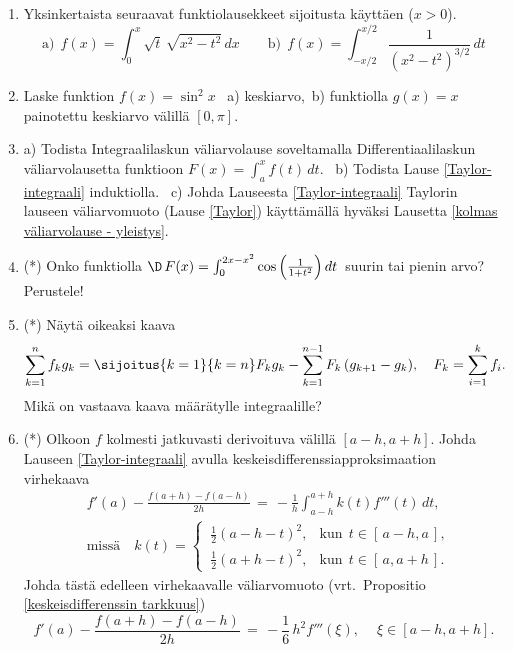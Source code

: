 \begin{enumerate}
\item
Yksinkertaista seuraavat funktiolausekkeet sijoitusta käyttäen ($x>0$).
\[
\text{a)}\ \ f(x)=\int_0^x \sqrt{t}\,\sqrt{x^2-t^2}\,dx \qquad
\text{b)}\ \ f(x)=\int_{-x/2}^{x/2} \frac{1}{(x^2-t^2)^{3/2}}\,dt
\]

\item
Laske funktion $f(x)=\sin^2x$ \ a) keskiarvo, \,b) funktiolla $g(x)=x$ painotettu keskiarvo
välillä $[0,\pi]$.


\item \label{H-int-6: todistuksia}
a) Todista Integraalilaskun väliarvolause soveltamalla Differentiaalilaskun väliarvolausetta
funktioon $F(x)=\int_a^x f(t)\,dt$. \ b) Todista Lause \ref{Taylor-integraali} induktiolla. \
c) Johda Lauseesta \ref{Taylor-integraali} Taylorin lauseen väliarvomuoto (Lause \ref{Taylor})
käyttämällä hyväksi Lausetta \ref{kolmas väliarvolause - yleistys}.

\item (*)
Onko funktiolla $\D\,F(x)=\int_0^{2x-x^2}\cos\left(\frac{1}{1+t^2}\right)dt\,$
suurin tai pienin arvo? Perustele!

\item (*) 
Näytä oikeaksi  kaava
\[
\sum_{k=1}^n f_k g_k = \sijoitus{k=1}{k=n} F_k g_k - \sum_{k=1}^{n-1} F_k\,(g_{k+1}-g_k), \quad
                       F_k = \sum_{i=1}^k f_i.
\]             
Mikä on vastaava kaava määrätylle integraalille?

\item (*) \label{H-int-6: virhekaava}
Olkoon $f$ kolmesti jatkuvasti derivoituva välillä $[a-h,a+h]$. Johda Lauseen
\ref{Taylor-integraali} avulla keskeisdifferenssiapproksimaation virhekaava
\begin{align*}
&f'(a)-\frac{f(a+h)-f(a-h)}{2h} \,=\, -\frac{1}{h}\int_{a-h}^{a+h} k(t)f'''(t)\,dt, \\[2mm]
&\text{missä}\quad k(t)=\begin{cases}
      \,\frac{1}{2}(a-h-t)^2, &\text{kun}\ \ t\in[\,a-h,a\,], \\
      \,\frac{1}{2}(a+h-t)^2, &\text{kun}\ \ t\in[\,a,a+h\,].
      \end{cases}
\end{align*}
Johda tästä edelleen virhekaavalle väliarvomuoto
(vrt.\ Propositio \ref{keskeisdifferenssin tarkkuus}) 
\[
f'(a)-\frac{f(a+h)-f(a-h)}{2h} \,=\, -\frac{1}{6}\,h^2 f'''(\xi), \quad\ \xi\in[a-h,a+h].
\]

\end{enumerate}